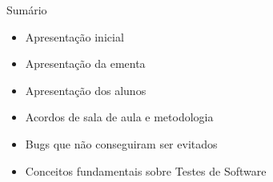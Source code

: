 
\begin{frame}{Sumário}
    \begin{itemize}
        \item Apresentação inicial
        \item Apresentação da ementa
        \item Apresentação dos alunos
        \item Acordos de sala de aula e metodologia
        \item Bugs que não conseguiram ser evitados
        \item Conceitos fundamentais sobre Testes de Software
    \end{itemize}
\end{frame}
